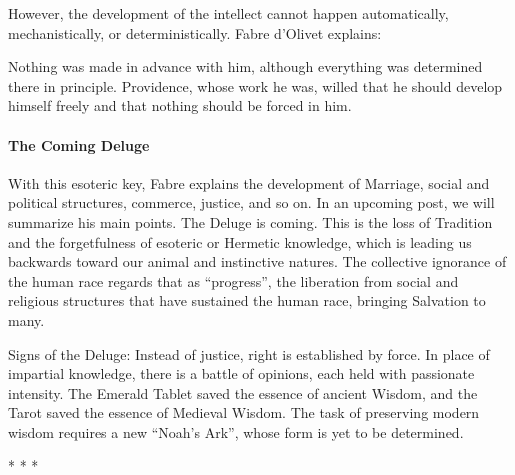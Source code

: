 However, the development of the intellect cannot happen automatically, mechanistically, or deterministically. Fabre d'Olivet explains:

\begin{quotex}
Nothing was made in advance with him, although everything was determined there in principle. Providence, whose work he was, willed that he should develop himself freely and that nothing should be forced in him.
\end{quotex}


\paragraph{The Coming Deluge}


With this esoteric key, Fabre explains the development of Marriage, social and political structures, commerce, justice, and so on. In an upcoming post, we will summarize his main points. The Deluge is coming. This is the loss of Tradition and the forgetfulness of esoteric or Hermetic knowledge, which is leading us backwards toward our animal and instinctive natures. The collective ignorance of the human race regards that as ``progress'', the liberation from social and religious structures that have sustained the human race, bringing Salvation to many.

Signs of the Deluge: Instead of justice, right is established by force. In place of impartial knowledge, there is a battle of opinions, each held with passionate intensity. The Emerald Tablet saved the essence of ancient Wisdom, and the Tarot saved the essence of Medieval Wisdom. The task of preserving modern wisdom requires a new ``Noah's Ark'', whose form is yet to be determined.



\begin{center}* * *\end{center}

